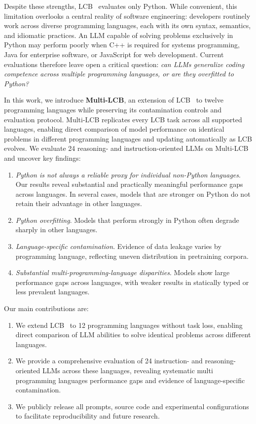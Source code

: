 \documentclass{article} %
\begin{document}
Despite these strengths, LCB~\citep{jain2024livecodebench} evaluates only Python. While convenient, this limitation overlooks a central reality of software engineering: developers routinely work across diverse programming languages, each with its own syntax, semantics, and idiomatic practices. An LLM capable of solving problems exclusively in Python may perform poorly when C++ is required for systems programming, Java for enterprise software, or JavaScript for web development. Current evaluations therefore leave open a critical question: \textit{can LLMs generalize coding competence across multiple programming languages, or are they overfitted to Python?}


In this work, we introduce \textbf{Multi-LCB}, an extension of LCB~\citep{jain2024livecodebench} to twelve programming languages while preserving its contamination controls and evaluation protocol.  
Multi-LCB replicates every LCB task across all supported languages, enabling direct comparison of model performance on identical problems in different programming languages and updating automatically as LCB evolves. We evaluate 24 reasoning- and instruction-oriented LLMs on Multi-LCB and uncover key findings:
\begin{enumerate}
\item \textit{Python is not always a reliable proxy for individual non-Python languages}.  Our results reveal substantial and practically meaningful performance gaps across languages. In several cases, models that are stronger on Python do not retain their advantage in other languages.
    \item \textit{Python overfitting}. Models that perform strongly in Python often degrade sharply in other languages.
    \item \textit{Language-specific contamination}. Evidence of data leakage varies by programming language, reflecting uneven distribution in pretraining corpora.
    \item \textit{Substantial multi-programming-language disparities}. Models show large performance gaps across languages, with weaker results in statically typed or less prevalent languages.
\end{enumerate}

Our main contributions are:
\begin{enumerate}
\item We extend LCB~\citep{jain2024livecodebench} to 12 programming languages without task loss, enabling direct comparison of LLM abilities to solve identical problems across different languages.
\item We provide a comprehensive evaluation of 24 instruction- and reasoning-oriented LLMs across these languages, revealing systematic multi programming languages performance gaps and evidence of language-specific contamination.
\item We publicly release all prompts, source code and experimental configurations  %
to facilitate reproducibility and future research.
\end{enumerate}
\end{document}
